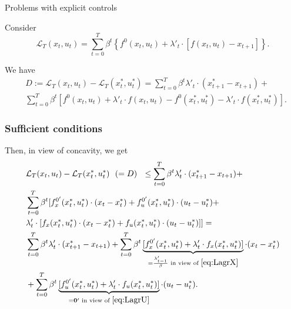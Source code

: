 \documentclass[10pt]{beamer}
\theoremstyle{definition}
\begin{document}
\begin{section}{Problems with explicit controls}
\begin{frame}[fragile]
Consider \[ \mathcal{L}_T(x_t,u_t) = \sum_{t=0}^{T}\beta^t \left\{ f^0(x_t,u_t) + \lambda'_t \cdot [f(x_t,u_t)-x_{t+1}] \right\} .\]

We have \begin{equation}
\begin{split}
& D := \mathcal{L}_T (x_t,u_t) - \mathcal{L}_T(x^*_t,u^*_t) = \sum_{t=0}^{T}\beta^t \lambda'_t \cdot (x^*_{t+1} - x_{t+1} )+  \\
& \sum_{t=0}^{T}\beta^t [ f^0(x_t,u_t) + \lambda'_t \cdot f(x_t,u_t) 
- f^0(x^*_t,u^*_t) - \lambda'_t \cdot f(x^*_t,u^*_t) ].
\end{split}
\label{eq:LagrDiff}
\end{equation}
\end{frame}


\begin{frame}[fragile]
\frametitle{Sufficient conditions}
Then, in view of concavity, we get \begin{equation*}
\begin{split}
&\mathcal{L}_T (x_t,u_t) - \mathcal{L}_T(x^*_t,u^*_t) ~~(= D)~~ \leq \sum_{t=0}^{T}\beta^t \lambda'_t \cdot (x^*_{t+1} - x_{t+1} )+  \\
&\sum_{t=0}^{T}\beta^t [ f^{0'}_x(x^*_t,u^*_t)\cdot(x_t-x_t^*) +f^{0'}_u(x^*_t,u^*_t)\cdot(u_t-u_t^*) +\\
& \lambda'_t \cdot [f_x(x^*_t,u^*_t)\cdot(x_t-x_t^*) + f_u(x^*_t,u^*_t)\cdot (u_t-u_t^*) ]] = \\
& \sum_{t=0}^{T}\beta^t \lambda'_t \cdot (x^*_{t+1} - x_{t+1} )+  \sum_{t=0}^{T}\beta^t \underbrace{[f^{0'}_x(x^*_t,u^*_t) + \lambda'_t \cdot f_x(x^*_t,u^*_t)]}_{=\frac{\lambda'_{t-1}}{\beta} \text{ in view of }  \eqref{eq:LagrX} }\cdot(x_t-x_t^*)\\
& + \sum_{t=0}^{T}\beta^t \underbrace{[f^{0'}_u(x^*_t,u^*_t) + \lambda'_t \cdot f_u(x^*_t,u^*_t)]}_{=\mathbf{0}' \text{ in view of } \eqref{eq:LagrU}}\cdot(u_t-u_t^*).
\end{split}
\end{equation*}
\end{frame}




\end{section}
\end{document}
